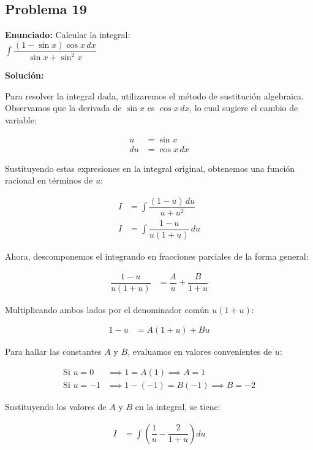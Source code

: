 \subsection*{Problema 19}

\textbf{Enunciado:} Calcular la integral:\\
$\displaystyle \int \dfrac{(1 - \sin x)\cos x \, dx}{\sin x + \sin^2 x}$

\textbf{Solución:}

Para resolver la integral dada, utilizaremos el método de sustitución algebraica. Observamos que la derivada de $\sin x$ es $\cos x \, dx$, lo cual sugiere el cambio de variable:

\begin{align*}
u &= \sin x \\
du &= \cos x \, dx
\end{align*}

Sustituyendo estas expresiones en la integral original, obtenemos una función racional en términos de $u$:

\begin{align*}
I &= \int \dfrac{(1 - u) \, du}{u + u^2} \\
I &= \int \dfrac{1 - u}{u(1 + u)} \, du
\end{align*}

Ahora, descomponemos el integrando en fracciones parciales de la forma general:

\begin{align*}
\dfrac{1 - u}{u(1 + u)} &= \dfrac{A}{u} + \dfrac{B}{1 + u}
\end{align*}

Multiplicando ambos lados por el denominador común $u(1 + u)$:

\begin{align*}
1 - u &= A(1 + u) + Bu
\end{align*}

Para hallar las constantes $A$ y $B$, evaluamos en valores convenientes de $u$:

\begin{align*}
\text{Si } u = 0 &\implies 1 = A(1) \implies A = 1 \\
\text{Si } u = -1 &\implies 1 - (-1) = B(-1) \implies B = -2
\end{align*}

Sustituyendo los valores de $A$ y $B$ en la integral, se tiene:

\begin{align*}
I &= \int \left( \dfrac{1}{u} - \dfrac{2}{1 + u} \right) du
\end{align*}

